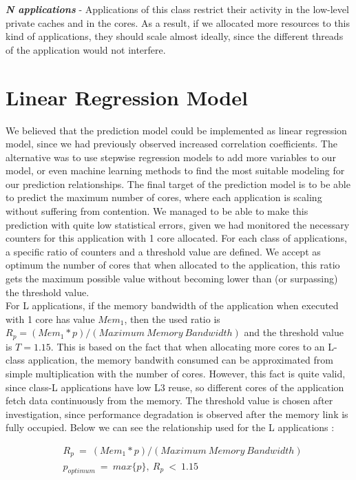 \documentclass[diploma]{Styles/softlab-thesis}
\begin{document}
\textbf{\emph{N applications}} - Applications of this class restrict their activity in the low-level private caches and in the cores. As a result, if we allocated more resources to this kind of applications, they should scale almost ideally, since the different threads of the application would not interfere. \\

\section{Linear Regression Model}

We believed that the prediction model could be implemented as linear regression model, since we had previously observed increased correlation coefficients. The alternative was to use stepwise regression models to add more variables to our model, or even machine learning methods to find the most suitable modeling for our prediction relationships. The final target of the prediction model is to be able to predict the maximum number of cores, where each application is scaling without suffering from contention. We managed to be able to make this prediction with quite low statistical errors, given we had monitored the necessary counters for this application with 1 core allocated. For each class of applications, a specific ratio of counters and a threshold value are defined. We accept as optimum the number of cores that when allocated to the application, this ratio gets the maximum possible value without becoming lower than (or surpassing) the threshold value. \\

For L applications, if the memory bandwidth of the application when executed with 1 core has value $Mem_{1}$, then the used ratio is $R_{p} = (Mem_{1}*p)/(Maximum \  Memory \ Bandwidth)$ and the threshold value is $T=1.15$. This is based on the fact that when allocating more cores to an L-class application, the memory bandwith consumed can be approximated from simple multiplication with the number of cores. However, this fact is quite valid, since class-L applications have low L3 reuse, so different cores of the application fetch data continuously from the memory. The threshold value is chosen after investigation, since performance degradation is observed after the memory link is fully occupied. Below we can see the relationship used for the L applications : 

\begin{align*}
&R_{p}\ =\ (Mem_{1}*p)/(Maximum \  Memory \ Bandwidth) \\[3pt]
&p_{optimum}\ =\  max\{p\},\ R_{p}\ <\ 1.15 \\[3pt]
\end{align*}
\end{document}
